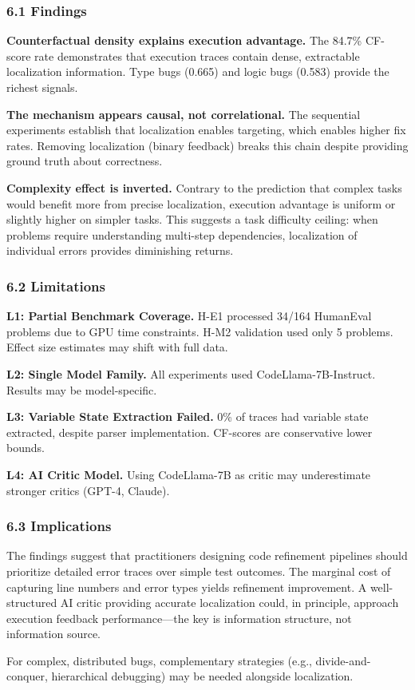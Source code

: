 
\subsubsection{6.1 Findings}

\textbf{Counterfactual density explains execution advantage.} The 84.7\% CF-score rate demonstrates that execution traces contain dense, extractable localization information. Type bugs (0.665) and logic bugs (0.583) provide the richest signals.

\textbf{The mechanism appears causal, not correlational.} The sequential experiments establish that localization enables targeting, which enables higher fix rates. Removing localization (binary feedback) breaks this chain despite providing ground truth about correctness.

\textbf{Complexity effect is inverted.} Contrary to the prediction that complex tasks would benefit more from precise localization, execution advantage is uniform or slightly higher on simpler tasks. This suggests a task difficulty ceiling: when problems require understanding multi-step dependencies, localization of individual errors provides diminishing returns.

\subsubsection{6.2 Limitations}

\textbf{L1: Partial Benchmark Coverage.} H-E1 processed 34/164 HumanEval problems due to GPU time constraints. H-M2 validation used only 5 problems. Effect size estimates may shift with full data.

\textbf{L2: Single Model Family.} All experiments used CodeLlama-7B-Instruct. Results may be model-specific.

\textbf{L3: Variable State Extraction Failed.} 0\% of traces had variable state extracted, despite parser implementation. CF-scores are conservative lower bounds.

\textbf{L4: AI Critic Model.} Using CodeLlama-7B as critic may underestimate stronger critics (GPT-4, Claude).

\subsubsection{6.3 Implications}

The findings suggest that practitioners designing code refinement pipelines should prioritize detailed error traces over simple test outcomes. The marginal cost of capturing line numbers and error types yields refinement improvement. A well-structured AI critic providing accurate localization could, in principle, approach execution feedback performance---the key is information structure, not information source.

For complex, distributed bugs, complementary strategies (e.g., divide-and-conquer, hierarchical debugging) may be needed alongside localization.
